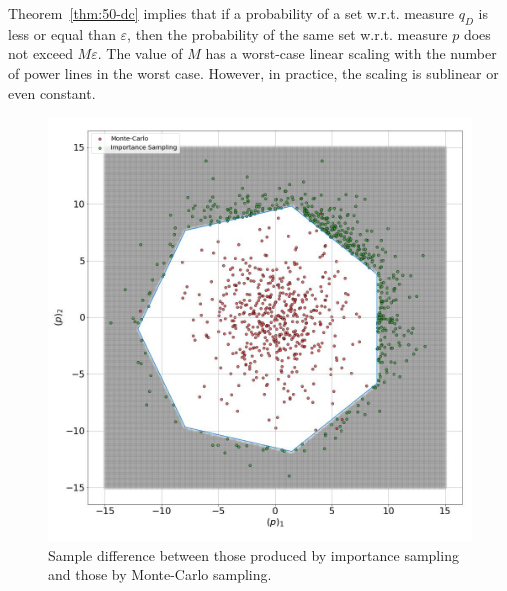 Theorem~\ref{thm:50-dc} implies that if a probability of a set w.r.t. measure $q_D$ is less or equal than $\varepsilon$, then the probability of the same set w.r.t. measure $p$ does not exceed $M\varepsilon$. %
The value of $M$ has a worst-case linear scaling with the number of power lines in the worst case. However, in practice, the scaling is sublinear or even constant.

\begin{figure}[!t]
  \centering

  \includegraphics[width=.8\textwidth]{Dissertation/images/dc_stochastic_approx/conditioned_vs_MC (1).jpg}
  \caption{Sample difference between those produced by importance sampling and those by Monte-Carlo sampling.}
  \label{fig:conv_vs_MC-dc}
  
\end{figure}

